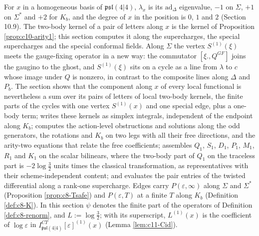 For $x$ in a homogeneous basis of $\mathfrak{psl}(4|4)$, $\lambda_x$ is its $\mathrm{ad}_\Delta$ eigenvalue, $-1$ on $\Sigma$, $+1$ on $\Sigma^*$ and $+2$ for $K_b$, and the degree of $x$ in the position is $0$, $1$ and $2$ (Section 10.9). The two-body kernel of a pair of letters along $x$ is the kernel of Proposition \ref{prop:c10-arity1}; this section computes it along the supercharges, the special supercharges and the special conformal fields. Along $\Sigma$ the vertex $S^{(1)}(\xi)$ meets the gauge-fixing operator in a new way: the commutator $[\xi.,Q^{GF}]$ joins the gaugino to the ghost, and $S^{(1)}(\xi)$ sits on a cycle as a line from $\lambda$ to $c$ whose image under $Q$ is nonzero, in contrast to the composite lines along $\Delta$ and $P_b$. The section shows that the component along $x$ of every local functional is nevertheless a sum over its pairs of letters of local two-body kernels, the finite parts of the cycles with one vertex $S^{(1)}(x)$ and one special edge, plus a one-body term; writes these kernels as simplex integrals, independent of the endpoint along $K_b$; computes the action-level obstructions and solutions along the odd generators, the rotations and $K_b$ on two legs with all their free directions, and the arity-two equations that relate the free coefficients; assembles $Q_1$, $S_1$, $D_1$, $P_1$, $M_1$, $R_1$ and $K_1$ on the scalar bilinears, where the two-body part of $Q_1$ on the traceless part is $-2\log\tfrac32$ units times the classical transformation, as representatives with their scheme-independent content; and evaluates the pair entries of the twisted differential along a rank-one supercharge. Edges carry $P(\varepsilon,\infty)$ along $\Sigma$ and $\Sigma^*$ (Proposition \ref{prop:c8-Tsafe}) and $P(\varepsilon,T)$ at a finite $T$ along $K_b$ (Definition \ref{def:c8-K}). In this section $\psi$ denotes the finite part of the operators of Definition \ref{def:c8-renorm}, and $L:=\log\tfrac32$; with its superscript, $L^{(1)}(x)$ is the coefficient of $\log\varepsilon$ in $I^{CT}_{\mathfrak{psl}(4|4)}[\varepsilon]^{(1)}(x)$ (Lemma \ref{lem:c11-Cid}).

